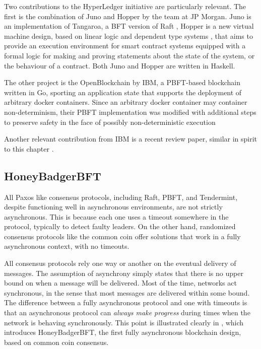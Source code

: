 Two contributions to the HyperLedger initiative are particularly relevant.
The first is the combination of Juno and Hopper by the team at JP Morgan.
Juno is an implementation of Tangaroa, a BFT version of Raft \cite{tangaroa},
Hopper is a new virtual machine design,
based on linear logic \cite{girard1987linear} and dependent type systems \cite{bove2009dependent},
that aims to provide an execution environment for smart contract systems equipped with a formal logic
for making and proving statements about the state of the system, or the behaviour of a contract.
Both Juno and Hopper are written in Haskell.

The other project is the OpenBlockchain by IBM, a PBFT-based blockchain written in Go,
sporting an application state that supports the deployment of arbitrary docker containers.
Since an arbitrary docker container may container non-determinism, their PBFT implementation
was modified with additional steps to preserve safety in the face of possibly non-deterministic execution \cite{cachin2016non}

Another relevant contribution from IBM is a recent review paper, similar in spirit to this chapter \cite{vukolic11quest}.

\subsection{HoneyBadgerBFT}

All Paxos like consensus protocols, including Raft, PBFT, and Tendermint, 
despite functioning well in asynchronous environments, are not strictly asynchronous.
This is because each one uses a timeout somewhere in the protocol, typically to detect faulty leaders.
On the other hand, randomized consensus protocols like the common coin offer solutions that work in 
a fully asynchronous context, with no timeouts.

All consensus protocols rely one way or another on the eventual delivery of messages.
The assumption of asynchrony simply states that there is no upper bound on when a message will be delivered.
Most of the time, networks act synchronous, in the sense that most messages are delivered within some bound.
The difference between a fully asynchronous protocol and one with timeouts is that 
an asynchronous protocol can \emph{always make progress} during times when the network is behaving synchronously.
This point is illustrated clearly in \cite{honeybadger}, which introduces HoneyBadgerBFT, 
the first fully asynchronous blockchain design, based on common coin consensus.

